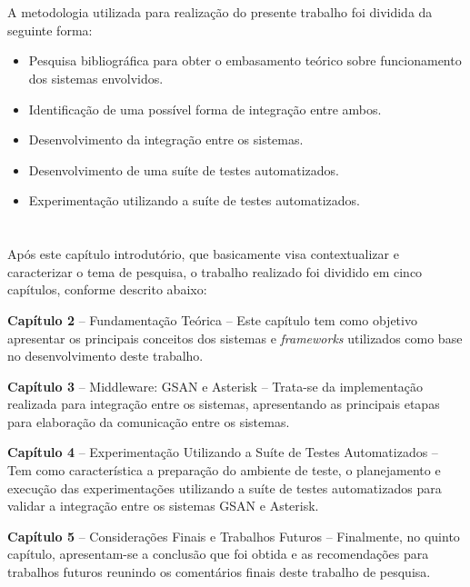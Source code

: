\section*{\fontsize{12}{1} }
A metodologia utilizada para realização do presente trabalho foi dividida da seguinte forma:
\begin{itemize}
	\item Pesquisa bibliográfica para obter o embasamento teórico sobre funcionamento dos sistemas envolvidos.
	\item Identificação de uma possível forma de integração entre ambos.
	\item Desenvolvimento da integração entre os sistemas.
	\item Desenvolvimento de uma suíte de testes automatizados.
	\item Experimentação utilizando a suíte de testes automatizados.
\end{itemize}

\section*{\fontsize{12}{1} }
	
Após este capítulo introdutório, que basicamente visa contextualizar e caracterizar o tema de pesquisa, o trabalho realizado foi dividido em cinco capítulos, conforme descrito abaixo:
\begin{description}
	\item \textbf{Capítulo 2 } – Fundamentação Teórica – Este capítulo tem como objetivo apresentar os principais conceitos dos sistemas e \textit{frameworks} utilizados como base no desenvolvimento deste trabalho.
	\item \textbf{Capítulo  3} – Middleware: GSAN e Asterisk – Trata-se da implementação realizada para integração entre os sistemas, apresentando as principais etapas para elaboração da comunicação entre os sistemas.
	\item \textbf{Capítulo  4} – Experimentação Utilizando a Suíte de Testes Automatizados – Tem como característica a preparação do ambiente de teste, o planejamento e execução das experimentações utilizando a suíte de testes automatizados para validar a integração entre os sistemas GSAN e Asterisk.
	\item \textbf{Capítulo 5} – Considerações Finais e Trabalhos Futuros – Finalmente, no quinto capítulo, apresentam-se a conclusão que foi obtida e as recomendações para trabalhos futuros reunindo os comentários finais deste trabalho de pesquisa.	
\end{description}
	

